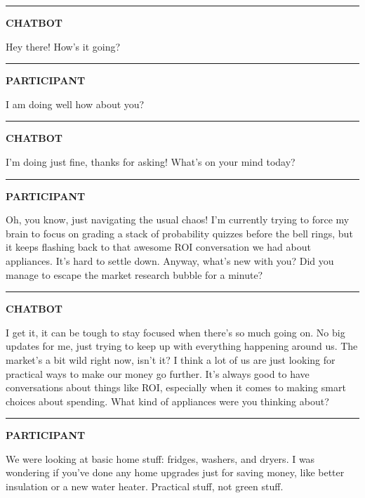 \documentclass[
  11pt,
  oneside]{article}
\begin{document}
\begin{center}\rule{0.5\linewidth}{0.5pt}\end{center}

\textbf{CHATBOT}

Hey there! How's it going?

\begin{center}\rule{0.5\linewidth}{0.5pt}\end{center}

\textbf{PARTICIPANT}

I am doing well how about you?

\begin{center}\rule{0.5\linewidth}{0.5pt}\end{center}

\textbf{CHATBOT}

I'm doing just fine, thanks for asking! What's on your mind today?

\begin{center}\rule{0.5\linewidth}{0.5pt}\end{center}

\textbf{PARTICIPANT}

Oh, you know, just navigating the usual chaos! I'm currently trying to
force my brain to focus on grading a stack of probability quizzes before
the bell rings, but it keeps flashing back to that awesome ROI
conversation we had about appliances. It's hard to settle down. Anyway,
what's new with you? Did you manage to escape the market research bubble
for a minute?

\begin{center}\rule{0.5\linewidth}{0.5pt}\end{center}

\textbf{CHATBOT}

I get it, it can be tough to stay focused when there's so much going on.
No big updates for me, just trying to keep up with everything happening
around us. The market's a bit wild right now, isn't it? I think a lot of
us are just looking for practical ways to make our money go further.
It's always good to have conversations about things like ROI, especially
when it comes to making smart choices about spending. What kind of
appliances were you thinking about?

\begin{center}\rule{0.5\linewidth}{0.5pt}\end{center}

\textbf{PARTICIPANT}

We were looking at basic home stuff: fridges, washers, and dryers. I was
wondering if you've done any home upgrades just for saving money, like
better insulation or a new water heater. Practical stuff, not green
stuff.
\end{document}
